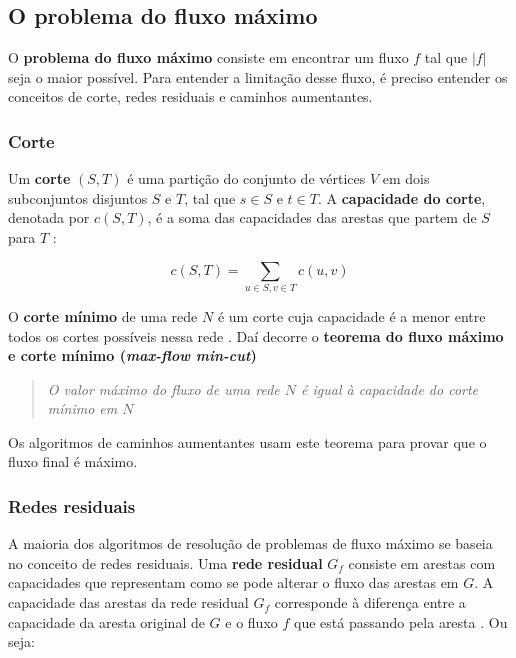 \subsection{O problema do fluxo máximo}

O \textbf{problema do fluxo máximo} consiste em encontrar um fluxo $f$ tal que $|f|$ seja o maior possível. Para entender a limitação desse fluxo, é preciso entender os conceitos de corte, redes residuais e caminhos aumentantes.

\subsubsection{Corte}

Um \textbf{corte} $(S,T)$ é uma partição do conjunto de vértices $V$ em dois subconjuntos disjuntos $S$ e $T$, tal que $s\in S$ e $t\in T$. A \textbf{capacidade do corte}, denotada por $c(S,T)$, é a soma das capacidades das arestas que partem de $S$ para $T$ \cite{cormen}:

\begin{equation}
    c(S,T) = \sum_{u\in S,v\in T}c(u,v)
\end{equation}

O \textbf{corte mínimo} de uma rede $N$ é um corte cuja capacidade é a menor entre todos os cortes possíveis nessa rede \cite{cormen}. Daí decorre o \textbf{teorema do fluxo máximo e corte mínimo (\textit{max-flow min-cut})}

\begin{quotation}
    \textit{O valor máximo do fluxo de uma rede $N$ é igual à capacidade do corte mínimo em $N$ \cite{jungnickel}}
\end{quotation}

Os algoritmos de caminhos aumentantes usam este teorema para provar que o fluxo final é máximo.

\subsubsection{Redes residuais}

A maioria dos algoritmos de resolução de problemas de fluxo máximo se baseia no conceito de redes residuais. Uma \textbf{rede residual} $G_f$ consiste em arestas com capacidades que representam como se pode alterar o fluxo das arestas em $G$. A capacidade das arestas da rede residual $G_f$ corresponde à diferença entre a capacidade da aresta original de $G$ e o fluxo $f$ que está passando pela aresta \cite{cormen}. Ou seja:

